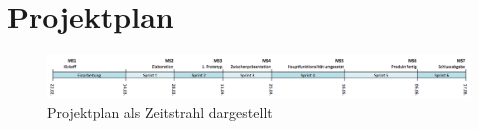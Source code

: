 \section{Projektplan}
\begin{figure}[H]
	\centering
	\includegraphics[width=\textwidth]{images/projektmanagement/zeitstrahl.png}
	\caption{Projektplan als Zeitstrahl dargestellt}
	\label{image-project-plan-timeline}
\end{figure}




